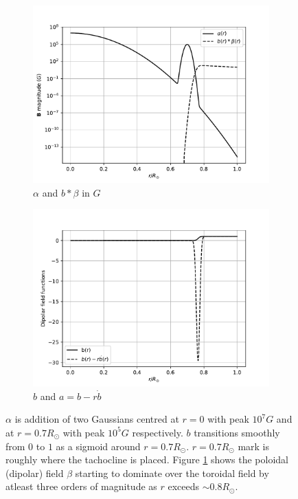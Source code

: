 \begin{figure}[h]
\begin{subfigure}{0.5\linewidth}
\centering
\includegraphics[scale=.5]{Chapter3/figs/alpha_beta}
\caption{$\alpha$ and $b * \beta$ in $G$}
\label{fig:alpha_beta}
\end{subfigure}
\begin{subfigure}{0.5\linewidth}
\centering
\includegraphics[scale=0.5]{Chapter3/figs/b}
\caption{$b$ and $a = b-r\dot{b}$}
\label{fig:a_b}
\end{subfigure}
\caption{$\alpha$ is addition of two Gaussians centred at $r=0$ with peak $10^7 G$ and at $r=0.7R_{\odot}$ with peak $10^5 G$ respectively. $b$ transitions smoothly from $0$ to $1$ as a sigmoid around $r=0.7R_{\odot}$. $r=0.7R_{\odot}$ mark is roughly where the tachocline is placed. Figure \ref{fig:alpha_beta} shows the poloidal (dipolar) field $\beta$ starting to dominate over the toroidal field by atleast three orders of magnitude as $r$ exceeds $\sim 0.8 R_{\odot}$.}
\end{figure}

